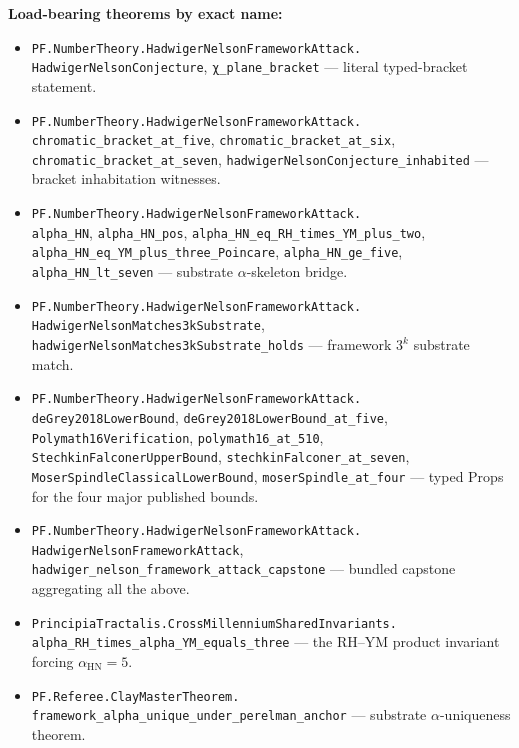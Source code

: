 \documentclass[11pt,a4paper]{article}
\theoremstyle{plain}
\theoremstyle{definition}
\begin{document}
\noindent\textbf{Load-bearing theorems by exact name:}

\begin{itemize}[leftmargin=*,nosep]
\item \texttt{PF.NumberTheory.HadwigerNelsonFrameworkAttack.\\
  HadwigerNelsonConjecture},
  \texttt{χ\_plane\_bracket}
  --- literal typed-bracket statement.
\item \texttt{PF.NumberTheory.HadwigerNelsonFrameworkAttack.\\
  chromatic\_bracket\_at\_five},
  \texttt{chromatic\_bracket\_at\_six},
  \texttt{chromatic\_bracket\_at\_seven},
  \texttt{hadwigerNelsonConjecture\_inhabited}
  --- bracket inhabitation witnesses.
\item \texttt{PF.NumberTheory.HadwigerNelsonFrameworkAttack.\\
  alpha\_HN},
  \texttt{alpha\_HN\_pos},
  \texttt{alpha\_HN\_eq\_RH\_times\_YM\_plus\_two},
  \texttt{alpha\_HN\_eq\_YM\_plus\_three\_Poincare},
  \texttt{alpha\_HN\_ge\_five},
  \texttt{alpha\_HN\_lt\_seven}
  --- substrate $\alpha$-skeleton bridge.
\item \texttt{PF.NumberTheory.HadwigerNelsonFrameworkAttack.\\
  HadwigerNelsonMatches3kSubstrate},
  \texttt{hadwigerNelsonMatches3kSubstrate\_holds}
  --- framework $3^{k}$ substrate match.
\item \texttt{PF.NumberTheory.HadwigerNelsonFrameworkAttack.\\
  deGrey2018LowerBound},
  \texttt{deGrey2018LowerBound\_at\_five},
  \texttt{Polymath16Verification},
  \texttt{polymath16\_at\_510},
  \texttt{StechkinFalconerUpperBound},
  \texttt{stechkinFalconer\_at\_seven},
  \texttt{MoserSpindleClassicalLowerBound},
  \texttt{moserSpindle\_at\_four}
  --- typed Props for the four major published bounds.
\item \texttt{PF.NumberTheory.HadwigerNelsonFrameworkAttack.\\
  HadwigerNelsonFrameworkAttack},
  \texttt{hadwiger\_nelson\_framework\_attack\_capstone}
  --- bundled capstone aggregating all the above.
\item \texttt{PrincipiaTractalis.CrossMillenniumSharedInvariants.\\
  alpha\_RH\_times\_alpha\_YM\_equals\_three}
  --- the RH--YM product invariant forcing $\alpha_{\mathrm{HN}} = 5$.
\item \texttt{PF.Referee.ClayMasterTheorem.\\
  framework\_alpha\_unique\_under\_perelman\_anchor}
  --- substrate $\alpha$-uniqueness theorem.
\end{itemize}
\end{document}
